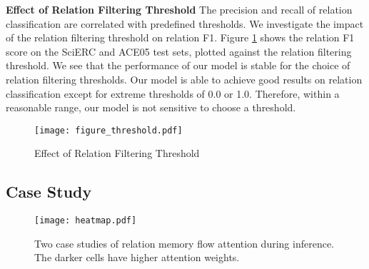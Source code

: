 \documentclass[sigconf]{acmart}
\begin{document}
\noindent\textbf{Effect of Relation Filtering Threshold}
The precision and recall of relation classification are correlated with predefined thresholds. We investigate the impact of the relation filtering threshold on relation F1. Figure  \ref{fig:figure_threshold} shows the relation F1 score on the SciERC and ACE05 test sets, plotted against the relation filtering threshold. We see that the performance of our model is stable for the choice of relation filtering thresholds. Our model is able to achieve good results on relation classification except for extreme thresholds of 0.0 or 1.0. Therefore, within a reasonable range, our model is not sensitive to choose a threshold.

\begin{figure}[h]
  \centering
  \texttt{[image: figure\_threshold.pdf]}
  \caption{Effect of Relation Filtering Threshold}
  \label{fig:figure_threshold}
\end{figure}



\subsection{Case Study}

\begin{figure*}[h]
  \centering
  \texttt{[image: heatmap.pdf]}
  \caption{Two case studies of relation memory flow attention during inference. The darker cells have higher attention weights.}
  \label{fig:vis_attn}
\end{figure*}
\end{document}
